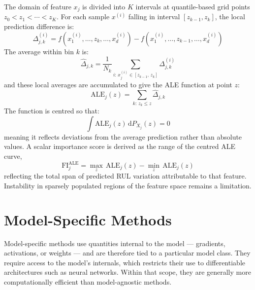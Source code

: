 The domain of feature $x_j$ is divided into $K$ intervals at quantile-based grid points $z_0 < z_1 < \cdots < z_K$. For each sample $x^{(i)}$ falling in interval $[z_{k-1}, z_k]$, the local prediction difference is:
%
\begin{equation}
    \Delta^{(i)}_{j,k} = f\!\left(x^{(i)}_1, \ldots, z_k, \ldots, x^{(i)}_d\right) - f\!\left(x^{(i)}_1, \ldots, z_{k-1}, \ldots, x^{(i)}_d\right)
    \label{eq:ale_diff}
\end{equation}
%
The average within bin $k$ is:
%
\begin{equation}
    \hat{\Delta}_{j,k} = \frac{1}{N_k} \sum_{i:\, x^{(i)}_j \in [z_{k-1},\, z_k]} \Delta^{(i)}_{j,k}
    \label{eq:ale_bin_avg}
\end{equation}
%
and these local averages are accumulated to give the ALE function at point $z$:
%
\begin{equation}
    \text{ALE}_j(z) = \sum_{k:\, z_k \leq z} \hat{\Delta}_{j,k}
    \label{eq:ale_func}
\end{equation}
%
The function is centred so that:
%
\begin{equation}
    \int \text{ALE}_j(z) \, \mathrm{d}P_{X_j}(z) = 0
    \label{eq:ale_centre}
\end{equation}
%
meaning it reflects deviations from the average prediction rather than absolute values. A scalar importance score is derived as the range of the centred ALE curve,
%
\begin{equation}
    \text{FI}^{\text{ALE}}_j = \max_z \,\text{ALE}_j(z) - \min_z \,\text{ALE}_j(z)
    \label{eq:ale_fi}
\end{equation}
%
reflecting the total span of predicted RUL variation attributable to that feature. Instability in sparsely populated regions of the feature space remains a limitation.

\section{Model-Specific Methods}

Model-specific methods use quantities internal to the model — gradients, activations, or weights — and are therefore tied to a particular model class. They require access to the model's internals, which restricts their use to differentiable architectures such as neural networks. Within that scope, they are generally more computationally efficient than model-agnostic methods.


